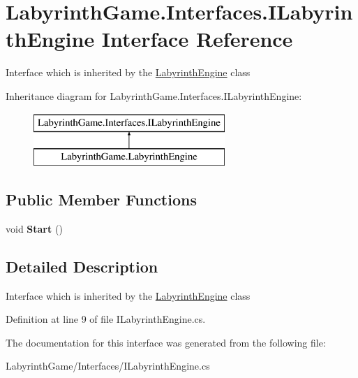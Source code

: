 \hypertarget{interface_labyrinth_game_1_1_interfaces_1_1_i_labyrinth_engine}{\section{Labyrinth\+Game.\+Interfaces.\+I\+Labyrinth\+Engine Interface Reference}
\label{interface_labyrinth_game_1_1_interfaces_1_1_i_labyrinth_engine}
}


Interface which is inherited by the \hyperlink{class_labyrinth_game_1_1_labyrinth_engine}{Labyrinth\+Engine} class  


Inheritance diagram for Labyrinth\+Game.\+Interfaces.\+I\+Labyrinth\+Engine\+:\begin{figure}[H]
\begin{center}
\leavevmode
\includegraphics[height=2.000000cm]{interface_labyrinth_game_1_1_interfaces_1_1_i_labyrinth_engine}
\end{center}
\end{figure}
\subsection*{Public Member Functions}
\begin{DoxyCompactItemize}
\item 
\hypertarget{interface_labyrinth_game_1_1_interfaces_1_1_i_labyrinth_engine_a1996d2d63b77bd1ba178ef03da5aa1bc}{void {\bfseries Start} ()}\label{interface_labyrinth_game_1_1_interfaces_1_1_i_labyrinth_engine_a1996d2d63b77bd1ba178ef03da5aa1bc}

\end{DoxyCompactItemize}


\subsection{Detailed Description}
Interface which is inherited by the \hyperlink{class_labyrinth_game_1_1_labyrinth_engine}{Labyrinth\+Engine} class 



Definition at line 9 of file I\+Labyrinth\+Engine.\+cs.



The documentation for this interface was generated from the following file\+:\begin{DoxyCompactItemize}
\item 
Labyrinth\+Game/\+Interfaces/I\+Labyrinth\+Engine.\+cs\end{DoxyCompactItemize}
